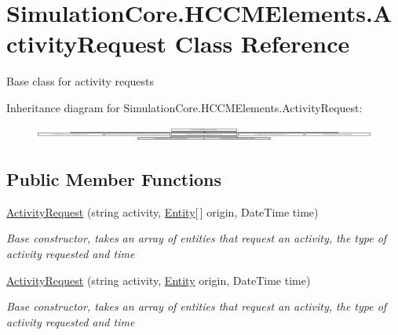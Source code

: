 \hypertarget{class_simulation_core_1_1_h_c_c_m_elements_1_1_activity_request}{}\section{Simulation\+Core.\+H\+C\+C\+M\+Elements.\+Activity\+Request Class Reference}
\label{class_simulation_core_1_1_h_c_c_m_elements_1_1_activity_request}


Base class for activity requests  


Inheritance diagram for Simulation\+Core.\+H\+C\+C\+M\+Elements.\+Activity\+Request\+:\begin{figure}[H]
\begin{center}
\leavevmode
\includegraphics[height=0.487663cm]{class_simulation_core_1_1_h_c_c_m_elements_1_1_activity_request}
\end{center}
\end{figure}
\subsection*{Public Member Functions}
\begin{DoxyCompactItemize}
\item 
\hyperlink{class_simulation_core_1_1_h_c_c_m_elements_1_1_activity_request_aac3b2aa0dbb7a4e8c26a44bac42d119a}{Activity\+Request} (string activity, \hyperlink{class_simulation_core_1_1_h_c_c_m_elements_1_1_entity}{Entity}\mbox{[}$\,$\mbox{]} origin, Date\+Time time)
\begin{DoxyCompactList}\small\item\em Base constructor, takes an array of entities that request an activity, the type of activity requested and time \end{DoxyCompactList}\item 
\hyperlink{class_simulation_core_1_1_h_c_c_m_elements_1_1_activity_request_a298b75f1a0f0aa041b28df46d021c7d9}{Activity\+Request} (string activity, \hyperlink{class_simulation_core_1_1_h_c_c_m_elements_1_1_entity}{Entity} origin, Date\+Time time)
\begin{DoxyCompactList}\small\item\em Base constructor, takes an array of entities that request an activity, the type of activity requested and time \end{DoxyCompactList}\end{DoxyCompactItemize}
